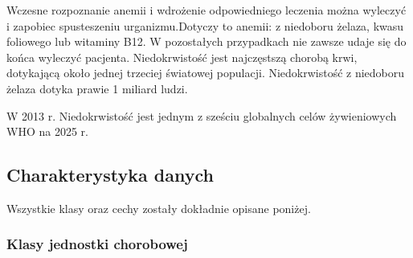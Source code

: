 \documentclass[runningheads]{llncs}
\begin{document}
Wczesne rozpoznanie anemii i wdrożenie odpowiedniego leczenia można wyleczyć i zapobiec spusteszeniu urganizmu.Dotyczy to anemii: z niedoboru żelaza, kwasu foliowego lub witaminy B12. W pozostałych przypadkach nie zawsze udaje się do końca wyleczyć pacjenta.
Niedokrwistość jest najczęstszą chorobą krwi, dotykającą około jednej trzeciej światowej populacji.\cite{anemia1}  Niedokrwistość z niedoboru żelaza dotyka prawie 1 miliard ludzi. 

\cite{anemia2}  W 2013 r. Niedokrwistość jest jednym z sześciu globalnych celów żywieniowych WHO \cite{who} na 2025 r. 
\subsection{Charakterystyka danych}

Wszystkie klasy oraz cechy zostały dokładnie opisane poniżej.

\subsubsection{Klasy jednostki chorobowej}
\end{document}
